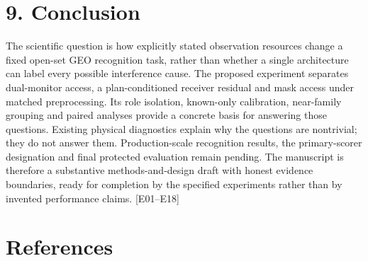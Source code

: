 \documentclass[
  10pt,
]{article}
\begin{document}
\section{9. Conclusion}\label{conclusion}

The scientific question is how explicitly stated observation resources
change a fixed open-set GEO recognition task, rather than whether a
single architecture can label every possible interference cause. The
proposed experiment separates dual-monitor access, a plan-conditioned
receiver residual and mask access under matched preprocessing. Its role
isolation, known-only calibration, near-family grouping and paired
analyses provide a concrete basis for answering those questions.
Existing physical diagnostics explain why the questions are nontrivial;
they do not answer them. Production-scale recognition results, the
primary-scorer designation and final protected evaluation remain
pending. The manuscript is therefore a substantive methods-and-design
draft with honest evidence boundaries, ready for completion by the
specified experiments rather than by invented performance claims.
{[}E01--E18{]}

\section{References}\label{references}
\end{document}
